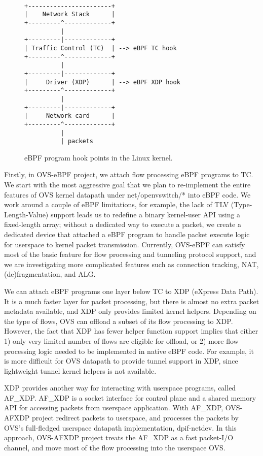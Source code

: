 \documentclass[10pt]{sigplanconf}
\begin{document}
\begin{figure}
{\scriptsize
\begin{verbatim}

+-----------------------+
|    Network Stack      |
+---------^-------------+
          |
+---------|-------------+
| Traffic Control (TC)  | --> eBPF TC hook
+---------^-------------+
          |
+---------|-------------+
|     Driver (XDP)      | --> eBPF XDP hook
+---------^-------------+
          |
+---------|-------------+
|     Network card      |
+---------^-------------+
          |
          | packets

\end{verbatim}
}
\vspace{-1.0em}
\caption{eBPF program hook points in the Linux kernel.}
\label{ebpf-hook}
\vspace{-1.0em}
\end{figure}

Firstly, in OVS-eBPF project, we attach flow processing eBPF programs to TC.
We start with the most aggressive goal that we plan to re-implement the entire
features of OVS kernel datapath under net/openvswitch/* into eBPF code.
We work around a couple of eBPF limitations, for example, the lack of TLV
(Type-Length-Value) support leads us to redefine a binary kernel-user API using
a fixed-length array; without a dedicated way to execute a packet, we
create a dedicated device that attached a eBPF program to handle packet
execute logic for userspace to kernel packet transmission.
Currently, OVS-eBPF can satisfy most of the basic feature for flow processing
and tunneling protocol support, and we are investigating more complicated
features such as connection tracking, NAT, (de)fragmentation, and ALG.

We can attach eBPF programs one layer below TC to XDP (eXpress Data Path).
It is a much faster layer for packet processing, but there is almost no extra
packet metadata available, and XDP only provides limited kernel helpers.
Depending on the type of flows, OVS can offload a subset of its flow processing
to XDP. However, the fact that XDP has fewer helper function support implies
that either 1) only very limited number of flows are eligible for offload,
or 2) more flow processing logic needed to be implemented in native eBPF code.
For example, it is more difficult for OVS datapath to provide tunnel support in
XDP, since lightweight tunnel kernel helpers is not available.
 
XDP provides another way for interacting with userspace programs, called AF\_XDP. 
AF\_XDP is a socket interface for control plane and a shared memory API for
accessing packets from userspace application. With AF\_XDP, OVS-AFXDP project
redirect packets to userspace, and processes the packets by OVS's full-fledged
userspace datapath implementation, dpif-netdev. In this approach, OVS-AFXDP
project treats the AF\_XDP as a fast packet-I/O channel, and move most of
the flow processing into the userspace OVS.
\end{document}
